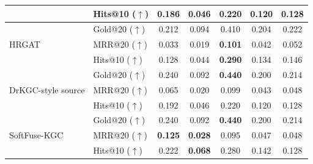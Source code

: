 \documentclass[pdflatex,sn-mathphys-num]{sn-jnl}
\newcommand{\softfuse}{SoftFuse-KGC}
\newcommand{\drkgc}{DrKGC}
\begin{document}
\begin{table}[!t]
{\begin{tabular*}{\textwidth}{@{\extracolsep{\fill}}llccccc@{}}
& Hits@10 ($\uparrow$) & 0.186 & 0.046 & 0.220 & 0.120 & 0.128 \\
\midrule
\multirow{3}{*}{HRGAT}
& Gold@20 ($\uparrow$) & 0.212 & 0.094 & 0.410 & 0.204 & 0.222 \\
& MRR@20 ($\uparrow$) & 0.033 & 0.019 & \textbf{0.101} & 0.042 & 0.052 \\
& Hits@10 ($\uparrow$) & 0.128 & 0.044 & \textbf{0.290} & 0.134 & 0.146 \\
\midrule
\multirow{3}{*}{\drkgc{}-style source}
& Gold@20 ($\uparrow$) & 0.240 & 0.092 & \textbf{0.440} & 0.200 & 0.214 \\
& MRR@20 ($\uparrow$) & 0.065 & 0.020 & 0.099 & 0.043 & 0.048 \\
& Hits@10 ($\uparrow$) & 0.192 & 0.046 & 0.220 & 0.120 & 0.128 \\
\midrule
\multirow{3}{*}{\softfuse{}}
& Gold@20 ($\uparrow$) & 0.240 & 0.092 & \textbf{0.440} & 0.200 & 0.214 \\
& MRR@20 ($\uparrow$) & \textbf{0.125} & \textbf{0.028} & 0.095 & 0.047 & 0.048 \\
& Hits@10 ($\uparrow$) & 0.222 & \textbf{0.068} & 0.280 & 0.142 & 0.128 \\
\bottomrule
\end{tabular*}}
\end{table}
\end{document}
